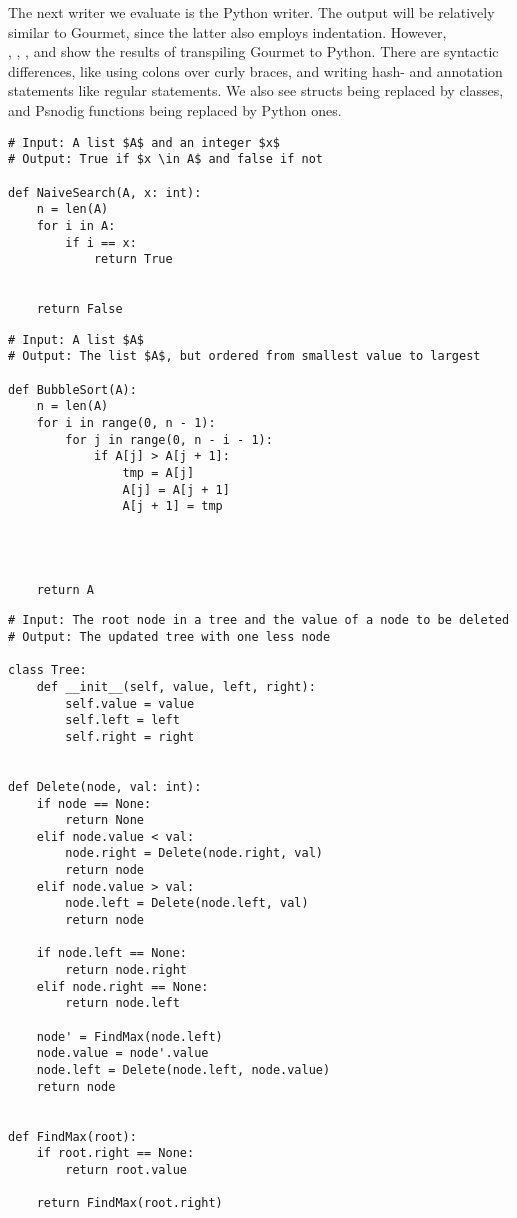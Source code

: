 The next writer we evaluate is the Python writer. The output will be relatively similar to Gourmet, since the latter also employs indentation. However,  \\

, , , and  show the results of transpiling Gourmet to Python. There are syntactic differences, like using colons over curly braces, and writing hash- and annotation statements like regular statements. We also see structs being replaced by classes, and Psnodig functions being replaced by Python ones. \\

\begin{lstlisting}[caption={The result of transpiling \Cref{naiveSearchGourmet} to Python.}, captionpos=b, label={naiveSearchPython}]
# Input: A list $A$ and an integer $x$
# Output: True if $x \in A$ and false if not

def NaiveSearch(A, x: int):
    n = len(A)
    for i in A:
        if i == x:
            return True


    return False
\end{lstlisting}

\begin{lstlisting}[caption={The result of transpiling \Cref{bubbleSortGourmet} to Python.}, captionpos=b, label={bubbleSortPython}]
# Input: A list $A$
# Output: The list $A$, but ordered from smallest value to largest

def BubbleSort(A):
    n = len(A)
    for i in range(0, n - 1):
        for j in range(0, n - i - 1):
            if A[j] > A[j + 1]:
                tmp = A[j]
                A[j] = A[j + 1]
                A[j + 1] = tmp




    return A
\end{lstlisting}

\begin{lstlisting}[caption={The result of transpiling \Cref{deleteBSTGourmet} to Python.}, captionpos=b, label={deleteBSTPython}]
# Input: The root node in a tree and the value of a node to be deleted
# Output: The updated tree with one less node

class Tree:
    def __init__(self, value, left, right):
        self.value = value
        self.left = left
        self.right = right


def Delete(node, val: int):
    if node == None:
        return None
    elif node.value < val:
        node.right = Delete(node.right, val)
        return node
    elif node.value > val:
        node.left = Delete(node.left, val)
        return node

    if node.left == None:
        return node.right
    elif node.right == None:
        return node.left

    node' = FindMax(node.left)
    node.value = node'.value
    node.left = Delete(node.left, node.value)
    return node


def FindMax(root):
    if root.right == None:
        return root.value

    return FindMax(root.right)
\end{lstlisting}

